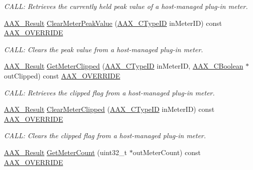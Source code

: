 \begin{DoxyCompactItemize}
\begin{DoxyCompactList}\small\item\em C\+A\+LL\+: Retrieves the currently held peak value of a host-\/managed plug-\/in meter. \end{DoxyCompactList}\item 
\mbox{\hyperlink{a00392_a4d8f69a697df7f70c3a8e9b8ee130d2f}{A\+A\+X\+\_\+\+Result}} \mbox{\hyperlink{a01905_a831e8acd4da78cccfd821892c82c9b96}{Clear\+Meter\+Peak\+Value}} (\mbox{\hyperlink{a00392_ac678f9c1fbcc26315d209f71a147a175}{A\+A\+X\+\_\+\+C\+Type\+ID}} in\+Meter\+ID) const \mbox{\hyperlink{a00392_ac2f24a5172689ae684344abdcce55463}{A\+A\+X\+\_\+\+O\+V\+E\+R\+R\+I\+DE}}
\begin{DoxyCompactList}\small\item\em C\+A\+LL\+: Clears the peak value from a host-\/managed plug-\/in meter. \end{DoxyCompactList}\item 
\mbox{\hyperlink{a00392_a4d8f69a697df7f70c3a8e9b8ee130d2f}{A\+A\+X\+\_\+\+Result}} \mbox{\hyperlink{a01905_a2bad61c587f08fc3f99ac297934ad4f9}{Get\+Meter\+Clipped}} (\mbox{\hyperlink{a00392_ac678f9c1fbcc26315d209f71a147a175}{A\+A\+X\+\_\+\+C\+Type\+ID}} in\+Meter\+ID, \mbox{\hyperlink{a00392_aa216506530f1d19a2965931ced2b274b}{A\+A\+X\+\_\+\+C\+Boolean}} $\ast$out\+Clipped) const \mbox{\hyperlink{a00392_ac2f24a5172689ae684344abdcce55463}{A\+A\+X\+\_\+\+O\+V\+E\+R\+R\+I\+DE}}
\begin{DoxyCompactList}\small\item\em C\+A\+LL\+: Retrieves the clipped flag from a host-\/managed plug-\/in meter. \end{DoxyCompactList}\item 
\mbox{\hyperlink{a00392_a4d8f69a697df7f70c3a8e9b8ee130d2f}{A\+A\+X\+\_\+\+Result}} \mbox{\hyperlink{a01905_ae09f0c6554d9cce7b9a4ee5b01aa9d70}{Clear\+Meter\+Clipped}} (\mbox{\hyperlink{a00392_ac678f9c1fbcc26315d209f71a147a175}{A\+A\+X\+\_\+\+C\+Type\+ID}} in\+Meter\+ID) const \mbox{\hyperlink{a00392_ac2f24a5172689ae684344abdcce55463}{A\+A\+X\+\_\+\+O\+V\+E\+R\+R\+I\+DE}}
\begin{DoxyCompactList}\small\item\em C\+A\+LL\+: Clears the clipped flag from a host-\/managed plug-\/in meter. \end{DoxyCompactList}\item 
\mbox{\hyperlink{a00392_a4d8f69a697df7f70c3a8e9b8ee130d2f}{A\+A\+X\+\_\+\+Result}} \mbox{\hyperlink{a01905_ac80621fb72de960d43f425d388928c3f}{Get\+Meter\+Count}} (uint32\+\_\+t $\ast$out\+Meter\+Count) const \mbox{\hyperlink{a00392_ac2f24a5172689ae684344abdcce55463}{A\+A\+X\+\_\+\+O\+V\+E\+R\+R\+I\+DE}}

\end{DoxyCompactItemize}
